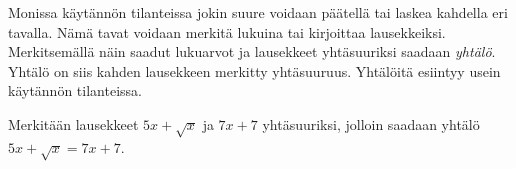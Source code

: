 Monissa käytännön tilanteissa jokin suure voidaan päätellä tai laskea kahdella eri tavalla. Nämä tavat voidaan merkitä lukuina tai kirjoittaa lausekkeiksi. Merkitsemällä näin saadut lukuarvot ja lausekkeet yhtäsuuriksi saadaan \emph{yhtälö}. Yhtälö on siis kahden lausekkeen merkitty yhtäsuuruus. Yhtälöitä esiintyy usein käytännön tilanteissa.

\begin{esimerkki}
Merkitään lausekkeet $5x+\sqrt{x}$ ja $7x+7$ yhtäsuuriksi, jolloin saadaan
yhtälö $5x+\sqrt{x} = 7x+7$.
\end{esimerkki}


\begin{esimerkki}
\begin{alakohdat}
\end{alakohdat}
\end{esimerkki}


